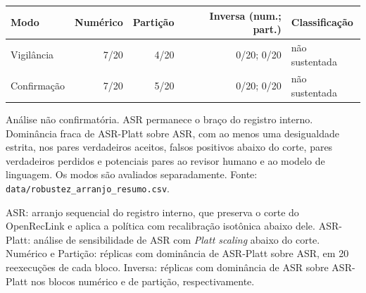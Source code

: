 \begin{tabular}{lrrrl}
\toprule
Modo & Numérico & Partição & Inversa (num.; part.) & Classificação \\
\midrule
Vigilância & 7/20 & 4/20 & 0/20; 0/20 & não sustentada \\
Confirmação & 7/20 & 5/20 & 0/20; 0/20 & não sustentada \\
\bottomrule
\end{tabular}
\par\noindent\footnotesize Análise não confirmatória. ASR permanece o braço do registro interno. Dominância fraca de ASR-Platt sobre ASR, com ao menos uma desigualdade estrita, nos pares verdadeiros aceitos, falsos positivos abaixo do corte, pares verdadeiros perdidos e potenciais pares ao revisor humano e ao modelo de linguagem. Os modos são avaliados separadamente. Fonte: \texttt{data/robustez\_arranjo\_resumo.csv}.
\par\footnotesize ASR: arranjo sequencial do registro interno, que preserva o corte do OpenRecLink e aplica a política com recalibração isotônica abaixo dele. ASR-Platt: análise de sensibilidade de ASR com \textit{Platt scaling} abaixo do corte. Numérico e Partição: réplicas com dominância de ASR-Platt sobre ASR, em 20 reexecuções de cada bloco. Inversa: réplicas com dominância de ASR sobre ASR-Platt nos blocos numérico e de partição, respectivamente.

